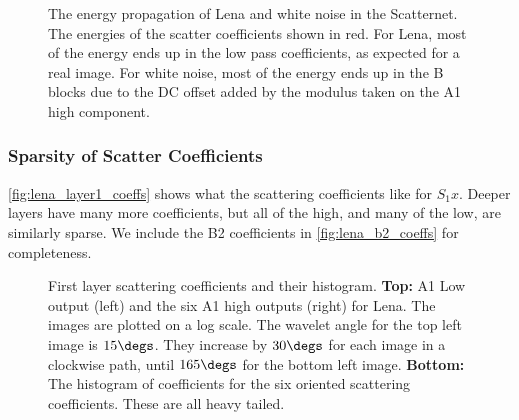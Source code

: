 	 \begin{figure}
    \centering
     \captionsetup{captionskip=12pt,farskip=8pt}
      \newline
      \vspace{1.2cm}
     \vspace{0.3cm}
			\caption[The energy propagation of Lena and white noise in the
      Scatternet]
              {The energy propagation of Lena and white noise in the
              Scatternet. The energies of the scatter coefficients shown in
              red. For Lena, most of the energy ends up in the low pass
              coefficients, as expected for a real image. For white noise, most
              of the energy ends up in the B blocks due to the DC offset
              added by the modulus taken on the A1 high component.}
      \label{fig:white_noise_scat}
  \end{figure}

\subsubsection{Sparsity of Scatter Coefficients}
  \autoref{fig:lena_layer1_coeffs} shows what the scattering coefficients like
  for $S_1x$. Deeper layers have many more coefficients, but all of the high,
  and many of the low, are similarly sparse. We include the B2 coefficients in
  \autoref{fig:lena_b2_coeffs} for completeness.

  \begin{figure}
    \vspace{-2cm}
    \centering
    \newline
    \caption[First layer scattering coefficients and their historgrams]
            {First layer scattering coefficients and their histogram.
            \textbf{Top:} A1 Low output (left) and the six A1 high outputs
            (right) for Lena. The images are plotted on a log scale. The wavelet
            angle for the top left image is $15\degs$. They increase by $30\degs$
            for each image in a clockwise path, until $165\degs$ for the bottom
            left image. \textbf{Bottom:} The histogram of coefficients for the six
            oriented scattering coefficients. These are all heavy tailed.}
    \label{fig:lena_layer1_coeffs}
  \end{figure}


